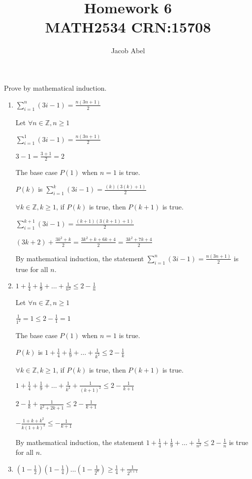 \documentclass[12pt,letterpaper,titlepage]{article}
\author{Jacob Abel}
\title{	Homework 6
	\\\large MATH2534 CRN:15708
}
\begin{document}
\maketitle
\begin{raggedright}
Prove by mathematical induction.
\begin{enumerate}[label=(\alph*)]

\item
$\sum_{i=1}^{n}(3i-1)=\frac{n(3n+1)}{2}$

Let $\forall n \in \mathbb{Z}, n \geq 1$

$\sum_{i=1}^{1}(3i-1)=\frac{n(3n+1)}{2}$

$3-1=\frac{3+1}{2} = 2$

The base case $P(1)$ when $n = 1$ is true.

$P(k)$ is $\sum_{i=1}^{k}(3i-1)=\frac{(k)(3(k)+1)}{2}$

$\forall k \in \mathbb{Z}, k \geq 1$, if $P(k)$ is true, then $P(k+1)$ is true.

$\sum_{i=1}^{k+1}(3i-1)=\frac{(k+1)(3(k+1)+1)}{2}$

$(3k+2)+\frac{3k^2+k}{2}=\frac{3k^2+k+6k+4}{2}=\frac{3k^2+7k+4}{2}$

By mathematical induction, the statement $\sum_{i=1}^{n}(3i-1)=\frac{n(3n+1)}{2}$ is true for all $n$.

\item
$1+\frac{1}{4}+\frac{1}{9}+\ldots+\frac{1}{n^2}\leq 2 - \frac{1}{n}$

Let $\forall n \in \mathbb{Z}, n \geq 1$

$\frac{1}{1^2} = 1 \leq 2 - \frac{1}{1} = 1$

The base case $P(1)$ when $n = 1$ is true.

$P(k)$ is $1+\frac{1}{4}+\frac{1}{9}+\ldots+\frac{1}{k^2}\leq 2 - \frac{1}{k}$

$\forall k \in \mathbb{Z}, k \geq 1$, if $P(k)$ is true, then $P(k+1)$ is true.

$1+\frac{1}{4}+\frac{1}{9}+\ldots+\frac{1}{k^2}+\frac{1}{(k+1)^2}\leq 2 - \frac{1}{k+1}$

$2 - \frac{1}{k}+\frac{1}{k^2+2k+1}\leq 2 - \frac{1}{k+1}$

$-\frac{1 + k + k^2}{k (1 + k)^2}\leq - \frac{1}{k+1}$


By mathematical induction, the statement $1+\frac{1}{4}+\frac{1}{9}+\ldots+\frac{1}{n^2}\leq 2 - \frac{1}{n}$ is true for all $n$.


\item
$(1-\frac{1}{2})(1-\frac{1}{4})\ldots(1-\frac{1}{2^n})\geq \frac{1}{4} + \frac{1}{2^{n+1}}$


\end{enumerate}
\end{raggedright}
\end{document}
